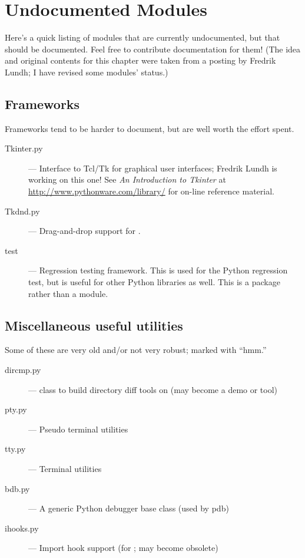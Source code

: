 \chapter{Undocumented Modules}
\label{undoc}

Here's a quick listing of modules that are currently undocumented, but
that should be documented.  Feel free to contribute documentation for
them!  (The idea and original contents for this chapter were taken
from a posting by Fredrik Lundh; I have revised some modules' status.)


\section{Frameworks}

Frameworks tend to be harder to document, but are well worth the
effort spent.

\begin{description}
\item[Tkinter.py]
--- Interface to Tcl/Tk for graphical user interfaces;
Fredrik Lundh is working on this one!  See \emph{An Introduction to
Tkinter} at \url{http://www.pythonware.com/library/} for on-line
reference material.

\item[Tkdnd.py]
--- Drag-and-drop support for .

\item[test]
--- Regression testing framework.  This is used for the Python
regression test, but is useful for other Python libraries as well.
This is a package rather than a module.
\end{description}


\section{Miscellaneous useful utilities}

Some of these are very old and/or not very robust; marked with ``hmm.''

\begin{description}
\item[dircmp.py]
--- class to build directory diff tools on (may become a demo or tool)

\item[pty.py]
--- Pseudo terminal utilities

\item[tty.py]
--- Terminal utilities

\item[bdb.py]
--- A generic Python debugger base class (used by pdb)

\item[ihooks.py]
--- Import hook support (for ; may become obsolete)
\end{description}


